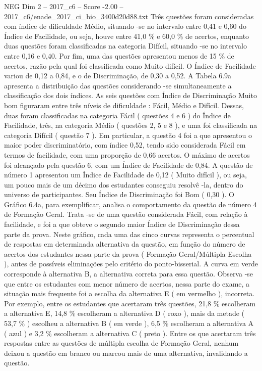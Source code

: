 \begin{textsample}{NEG Dim 2 – 2017\_c6 – Score -2.00 – 2017\_c6/enade\_2017\_ci\_bio\_3400d20d88.txt}
Três questões foram consideradas com índice de dificuldade Médio, situando -se no intervalo entre 0,41 e 0,60 do Índice de Facilidade, ou seja, houve entre 41,0 \% e 60,0 \% de acertos, enquanto duas questões foram classificadas na categoria Difícil, situando -se no intervalo entre 0,16 e 0,40.
Por fim, uma das questões apresentou menos de 15 \% de acertos, razão pela qual foi classificada como Muito difícil.
O Índice de Facilidade variou de 0,12 a 0,84, e o de Discriminação, de 0,30 a 0,52.
A Tabela 6.9a apresenta a distribuição das questões considerando -se simultaneamente a classificação dos dois índices.
As seis questões com Índice de Discriminação Muito bom figuraram entre três níveis de dificuldade : Fácil, Médio e Difícil.
Dessas, duas foram classificadas na categoria Fácil ( questões 4 e 6 ) do Índice de Facilidade, três, na categoria Médio ( questões 2, 5 e 8 ), e uma foi classificada na categoria Difícil ( questão 7 ).
Em particular, a questão 4 foi a que apresentou o maior poder discriminatório, com índice 0,52, tendo sido considerada Fácil em termos de facilidade, com uma proporção de 0,66 acertos.
O máximo de acertos foi alcançado pela questão 6, com um Índice de Facilidade de 0,84.
A questão de número 1 apresentou um Índice de Facilidade de 0,12 ( Muito difícil ), ou seja, um pouco mais de um décimo dos estudantes conseguiu resolvê -la, dentro do universo de participantes.
Seu Índice de Discriminação foi Bom ( 0,30 ).
O Gráfico 6.4a, para exemplificar, analisa o comportamento da questão de número 4 de Formação Geral.
Trata -se de uma questão considerada Fácil, com relação à facilidade, e foi a que obteve o segundo maior Índice de Discriminação dessa parte da prova.
Neste gráfico, cada uma das cinco curvas representa o percentual de respostas em determinada alternativa da questão, em função do número de acertos dos estudantes nessa parte da prova ( Formação Geral/Múltipla Escolha ), antes de possíveis eliminações pelo critério do ponto-bisserial.
A curva em verde corresponde à alternativa B, a alternativa correta para essa questão.
Observa -se que entre os estudantes com menor número de acertos, nessa parte do exame, a situação mais frequente foi a escolha da alternativa E ( em vermelho ), incorreta.
Por exemplo, entre os estudantes que acertaram três questões, 21,8 \% escolheram a alternativa E, 14,8 \% escolheram a alternativa D ( roxo ), mais da metade ( 53,7 \% ) escolheu a alternativa B ( em verde ), 6,5 \% escolheram a alternativa A ( azul ) e 3,2 \% escolheram a alternativa C ( preto ).
Entre os que acertaram três respostas entre as questões de múltipla escolha de Formação Geral, nenhum deixou a questão em branco ou marcou mais de uma alternativa, invalidando a questão.

\end{textsample}
